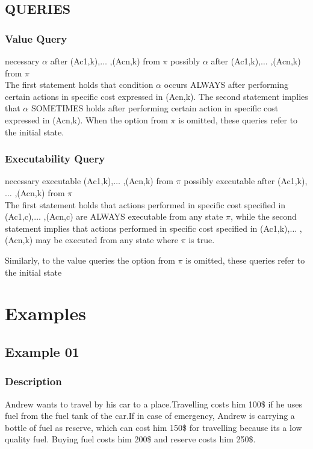 \documentclass[11pt]{article}
\begin{document}
\subsection{QUERIES}
\subsubsection{Value Query}
necessary $ \alpha $  after (Ac1,k),$ \ldots $ ,(Acn,k) from $\pi$
possibly $ \alpha $  after (Ac1,k),$ \ldots $ ,(Acn,k) from $\pi$\\
The first statement holds that condition $ \alpha $  occurs ALWAYS after performing certain actions in specific cost expressed in (Acn,k). The second statement implies that $ \alpha $  SOMETIMES holds after performing certain action in specific cost expressed in (Acn,k). When the option from $\pi$ is omitted, these queries refer to the initial state.\par
\subsubsection{Executability Query}
necessary executable (Ac1,k),$ \ldots $ ,(Acn,k) from $\pi$
possibly executable after (Ac1,k),$ \ldots $ ,(Acn,k) from $\pi$\\
The first statement holds that actions performed in specific cost specified in (Ac1,c),$ \ldots $ ,(Acn,c) are ALWAYS executable from any state $\pi$, while the second statement implies that actions performed in specific cost specified in (Ac1,k),$ \ldots $ ,(Acn,k) may be executed from any state where $\pi$ is true.\par
Similarly, to the value queries the option from $\pi$ is omitted, these queries refer to the initial state\par
\section{Examples}\label{sec:Examples}
\subsection{Example 01}\label{example:ex01}
\subsubsection{Description}\label{par:p101}
Andrew wants to travel by his car to a place.Travelling costs him 100\$ if he uses fuel from the fuel tank of the car.If in case of emergency, Andrew is carrying a bottle of fuel as reserve, which can cost him 150\$ for travelling because its a low quality fuel. Buying fuel costs him 200\$ and reserve costs him 250\$.\\
\end{document}
